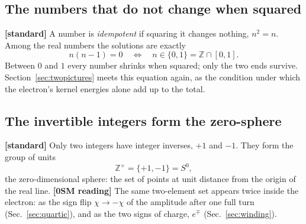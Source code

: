 \documentclass[%
 reprint, amsmath,amssymb, aps, prb, ]{revtex4-2}
\numberwithin{equation}{section}
\begin{document}
\subsection{The numbers that do not change when squared}

\textbf{[standard]} A number is \emph{idempotent} if squaring it changes nothing, $n^2=n$. Among the real numbers the solutions are exactly
\begin{equation}
n(n-1)=0 \quad\Longleftrightarrow\quad n\in\{0,1\} = \mathbb{Z}\cap[0,1].
\label{eq:idem}
\end{equation}
Between $0$ and $1$ every number shrinks when squared; only the two ends survive. Section~\ref{sec:twopictures} meets this equation again, as the condition under which the electron's kernel energies alone add up to the total.

\subsection{The invertible integers form the zero-sphere}

\textbf{[standard]} Only two integers have integer inverses, $+1$ and $-1$. They form the group of units
\begin{equation}
\mathbb{Z}^{\times}=\{+1,-1\} = S^0 ,
\label{eq:units}
\end{equation}
the zero-dimensional sphere: the set of points at unit distance from the origin of the real line. \textbf{[0SM reading]} The same two-element set appears twice inside the electron: as the sign flip $\chi\to-\chi$ of the amplitude after one full turn (Sec.~\ref{sec:quartic}), and as the two signs of charge, $e^{\mp}$ (Sec.~\ref{sec:winding}).
\end{document}
